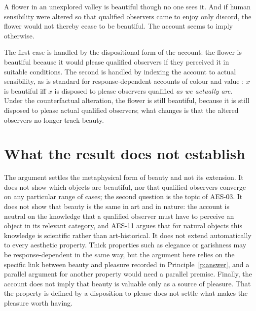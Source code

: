 \documentclass{situationist-preprint}
\begin{document}
\begin{objection}\label{o:unobs}
A flower in an unexplored valley is beautiful though no one sees it. And if human sensibility were altered so that qualified observers came to enjoy only discord, the flower would not thereby cease to be beautiful. The account seems to imply otherwise.
\end{objection}

\begin{reply}
The first case is handled by the dispositional form of the account: the flower is beautiful because it would please qualified observers if they perceived it in suitable conditions. The second is handled by indexing the account to actual sensibility, as is standard for response-dependent accounts of colour and value \citep{Johnston1989,Wright1992}: $x$ is beautiful iff $x$ is disposed to please observers qualified \emph{as we actually are}. Under the counterfactual alteration, the flower is still beautiful, because it is still disposed to please actual qualified observers; what changes is that the altered observers no longer track beauty.
\end{reply}

\section{What the result does not establish}

The argument settles the metaphysical form of beauty and not its extension. It does not show which objects are beautiful, nor that qualified observers converge on any particular range of cases; the second question is the topic of AES-03. It does not show that beauty is the same in art and in nature: the account is neutral on the knowledge that a qualified observer must have to perceive an object in its relevant category, and AES-11 argues that for natural objects this knowledge is scientific rather than art-historical. It does not extend automatically to every aesthetic property. Thick properties such as elegance or garishness may be response-dependent in the same way, but the argument here relies on the specific link between beauty and pleasure recorded in Principle~\ref{p:answer}, and a parallel argument for another property would need a parallel premise. Finally, the account does not imply that beauty is valuable only as a source of pleasure. That the property is defined by a disposition to please does not settle what makes the pleasure worth having.
\end{document}
